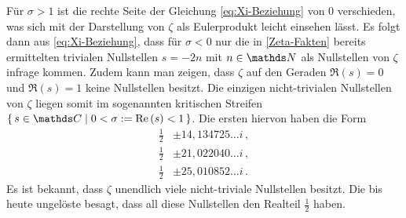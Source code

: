 Für $\sigma > 1$ ist die rechte Seite der Gleichung \eqref{eq:Xi-Beziehung} von $0$ verschieden, was sich mit der Darstellung von $\zeta$ als Eulerprodukt leicht einsehen lässt. Es folgt dann aus \eqref{eq:Xi-Beziehung}, dass für $\sigma < 0$ nur die in \autoref{Zeta-Fakten} bereits ermittelten \glqq{}trivialen Nullstellen\grqq{} $s = -2n$ mit $n \in \NN$ als Nullstellen von $\zeta$ infrage kommen. Zudem kann man zeigen, dass $\zeta$ auf den Geraden $\Re(s) = 0$ und $\Re(s) = 1$ keine Nullstellen besitzt. Die einzigen \glqq{}nicht-trivialen\grqq{} Nullstellen von $\zeta$ liegen somit im sogenannten \glqq{}kritischen Streifen\grqq{} $\Set {s \in \CC \mid 0 < \sigma := \Re(s) < 1}$. Die \glqq{}ersten\grqq{} hiervon haben die Form
\begin{align*}
	\tfrac 12 &\pm 14,134725\ldots i \,, \\
	\tfrac 12 &\pm 21,022040\ldots i \,, \\
	\tfrac 12 &\pm 25,010852\ldots i \,.
\end{align*}
Es ist bekannt, dass $\zeta$ unendlich viele nicht-triviale Nullstellen besitzt. Die bis heute ungelöste  besagt, dass all diese Nullstellen den Realteil $\frac 12$ haben.